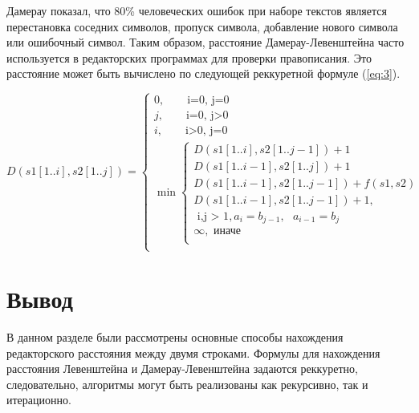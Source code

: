 Дамерау показал, что 80\% человеческих ошибок при наборе текстов является перестановка соседних символов, пропуск символа, добавление нового символа или ошибочный символ\cite{Damerau_Levenshtein}. Таким образом, расстояние Дамерау-Левенштейна часто используется в редакторских программах для проверки правописания.
Это расстояние может быть вычислено по следующей реккуретной формуле (\ref{eq:3}).

\begin{equation}
	D(s1[1..i], s2[1..j]) = 
	\begin{cases}
		0, \quad \phantom{\infty}\text{i=0, j=0}\\
		j, \quad \phantom{\infty}\text{i=0, j>0}\\
		i, \quad \phantom{\infty}\text{i>0, j=0}\\
		\min \begin{cases}
			D(s1[1..i], s2[1..j-1]) + 1\\
			D(s1[1..i-1], s2[1..j]) + 1\\
			D(s1[1..i-1], s2[1..j-1]) + f(s1, s2)\\
			D(s1[1..i-1], s2[1..j-1]) + 1, \\
			\text{   i,j > 1$,a_{i}=b_{j-1},$ $a_{i-1}=b_{j}$}\\
			{\infty},\text{      иначе}\\
		\end{cases}\\
		
	\end{cases}
	\label{eq:3}
\end{equation}

\section{Вывод}
В данном разделе были рассмотрены основные способы нахождения редакторского расстояния между двумя строками. Формулы для нахождения расстояния Левенштейна и Дамерау-Левенштейна задаются реккуретно, следовательно, алгоритмы могут быть реализованы как рекурсивно, так и итерационно.